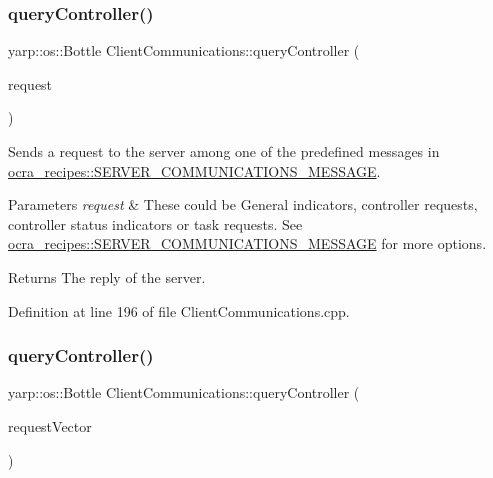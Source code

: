 \subsubsection{\texorpdfstring{query\+Controller()}{queryController()}\hspace{0.1cm}{\footnotesize\ttfamily [2/3]}}
{\footnotesize\ttfamily yarp\+::os\+::\+Bottle Client\+Communications\+::query\+Controller (\begin{DoxyParamCaption}\item[{const \hyperlink{namespaceocra__recipes_ae6246916f1927f7a201cc153ad76b07d}{S\+E\+R\+V\+E\+R\+\_\+\+C\+O\+M\+M\+U\+N\+I\+C\+A\+T\+I\+O\+N\+S\+\_\+\+M\+E\+S\+S\+A\+GE}}]{request }\end{DoxyParamCaption})}

Sends a request to the server among one of the predefined messages in \hyperlink{namespaceocra__recipes_ae6246916f1927f7a201cc153ad76b07d}{ocra\+\_\+recipes\+::\+S\+E\+R\+V\+E\+R\+\_\+\+C\+O\+M\+M\+U\+N\+I\+C\+A\+T\+I\+O\+N\+S\+\_\+\+M\+E\+S\+S\+A\+GE}.


\begin{DoxyParams}{Parameters}
{\em request} & These could be General indicators, controller requests, controller status indicators or task requests. See \hyperlink{namespaceocra__recipes_ae6246916f1927f7a201cc153ad76b07d}{ocra\+\_\+recipes\+::\+S\+E\+R\+V\+E\+R\+\_\+\+C\+O\+M\+M\+U\+N\+I\+C\+A\+T\+I\+O\+N\+S\+\_\+\+M\+E\+S\+S\+A\+GE} for more options.\\
\hline
\end{DoxyParams}
\begin{DoxyReturn}{Returns}
The reply of the server. 
\end{DoxyReturn}


Definition at line 196 of file Client\+Communications.\+cpp.

\hypertarget{classocra__recipes_1_1ClientCommunications_a12e293ab0cd846cf44f20a1fc61f82dc}{}\label{classocra__recipes_1_1ClientCommunications_a12e293ab0cd846cf44f20a1fc61f82dc} 
\subsubsection{\texorpdfstring{query\+Controller()}{queryController()}\hspace{0.1cm}{\footnotesize\ttfamily [3/3]}}
{\footnotesize\ttfamily yarp\+::os\+::\+Bottle Client\+Communications\+::query\+Controller (\begin{DoxyParamCaption}\item[{const std\+::vector$<$ \hyperlink{namespaceocra__recipes_ae6246916f1927f7a201cc153ad76b07d}{S\+E\+R\+V\+E\+R\+\_\+\+C\+O\+M\+M\+U\+N\+I\+C\+A\+T\+I\+O\+N\+S\+\_\+\+M\+E\+S\+S\+A\+GE} $>$}]{request\+Vector }\end{DoxyParamCaption})}

